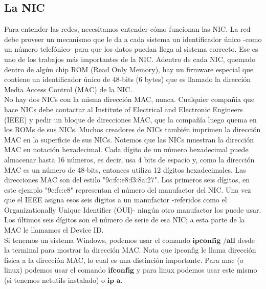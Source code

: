 \documentclass[12pt]{report}
\begin{document}
\subsection{La NIC}
Para entender las redes, necesitamos entender cómo funcionan las NIC. 
La red debe proveer un mecanismo que le da a cada sistema un identificador 
único -como un número telefónico- para que los datos puedan llega al 
sistema correcto. Ese es uno de los trabajos más importantes de la NIC.
Adentro de cada NIC, quemado dentro de algún chip ROM (Read Only Memory),
hay un firmware especial que contiene un identificador único de 48-bits (6 bytes)
que es llamado la dirección Media Access Control (MAC) de la NIC.\\
No hay dos NICs con la misma dirección MAC, nunca. Cualquier compañía que 
hace NICs debe contactar al Institute of Electrical and Electronic Engineers
(IEEE) y pedir un bloque de direcciones MAC, que la compañía luego quema
en los ROMs de sus NICs. Muchos creadores de NICs también imprimen la 
dirección MAC en la superficie de sus NICs. Notemos que las NICs muestran 
la dirección MAC en notación hexadecimal. Cada dígito de un número hexadecimal 
puede almacenar hasta 16 números, es decir, usa 4 bits de espacio y, como
la dirección MAC es un número de 48-bits, entonces utiliza 12 dígitos hexadecimales.
Las direcciones MAC son del estilo "9c:fc:e8:f3:8a:27". Los primeros seis dígitos, 
en este ejemplo "9c:fc:e8" representan el número del manufactor del NIC. 
Una vez que el IEEE asigna esos seis dígitos a un manufactor -referidos como 
el Organizationally Unique Identifier (OUI)- ningún otro manufactor los puede usar.
Los últimos seis dígitos son el número de serie de esa NIC; a esta parte de la MAC
le llamamos el Device ID.\\
Si tenemos un sistema Windows, podemos usar el comando $\textbf{ipconfig /all}$
desde la terminal para mostrar la dirección MAC. Nota que ipconfig le llama 
dirección física a la dirección MAC, lo cual es una distinción importante.
Para mac (o linux) podemos usar el comando $\textbf{ifconfig}$ y para linux podemos
usar este mismo (si tenemos netutils instalado) o $\textbf{ip a}$.
\end{document}
